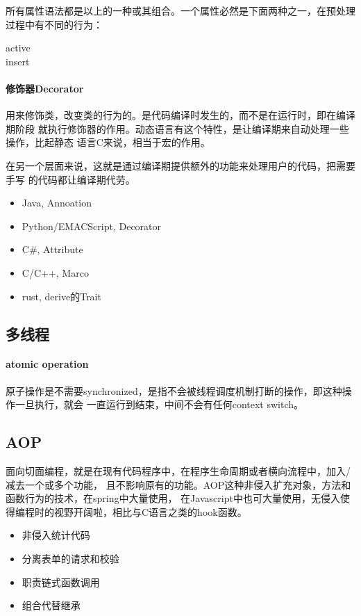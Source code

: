 所有属性语法都是以上的一种或其组合。一个属性必然是下面两种之一，在预处理过程中有不同的行为：

\begin{description}
    \item [active] 
    \item [insert] 
\end{description}

\paragraph{修饰器Decorator}
用来修饰类，改变类的行为的。是代码编译时发生的，而不是在运行时，即在编译期阶段
就执行修饰器的作用。动态语言有这个特性，是让编译期来自动处理一些操作，比起静态
语言C来说，相当于宏的作用。

在另一个层面来说，这就是通过编译期提供额外的功能来处理用户的代码，把需要手写
的代码都让编译期代劳。
\begin{itemize}
    \item {Java, Annoation}
    \item {Python/EMACScript, Decorator}
    \item {C\#, Attribute}
    \item {C/C++, Marco}
    \item {rust, derive的Trait}
\end{itemize}

\subsection{多线程}

\paragraph{atomic operation}
原子操作是不需要synchronized，是指不会被线程调度机制打断的操作，即这种操作一旦执行，就会
一直运行到结束，中间不会有任何context switch。

\subsection{AOP}
面向切面编程，就是在现有代码程序中，在程序生命周期或者横向流程中，加入/减去一个或多个功能，
且不影响原有的功能。AOP这种非侵入扩充对象，方法和函数行为的技术，在spring中大量使用，
在Javascript中也可大量使用，无侵入使得编程时的视野开阔啦，相比与C语言之类的hook函数。
\begin{itemize}
    \item {非侵入统计代码}
    \item {分离表单的请求和校验}
    \item {职责链式函数调用}
    \item {组合代替继承}
\end{itemize}

